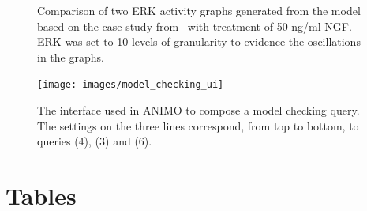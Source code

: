 \documentclass{bmcart}
\begin{document}
\begin{backmatter}
\begin{figure}[!htb]
\begin{center}
\end{center}
  \caption{Comparison of two ERK activity graphs generated from the model based on the case study from~\cite{animo-bibe} with treatment of 50 ng/ml NGF.
  ERK was set to 10 levels of granularity to evidence the oscillations in the graphs.
  \label{fig:comparison-graph-animo}}
\end{figure}

\begin{figure}[htb]
  \begin{center}
    \texttt{[image: images/model\_checking\_ui]}
  \end{center}
  \caption{The interface used in ANIMO to compose a model checking query.
  The settings on the three lines correspond, from top to bottom,
  to queries (4), (3) and (6).\label{fig:model-checking-ui}}
\end{figure}




\section*{Tables}



\end{backmatter}
\end{document}
